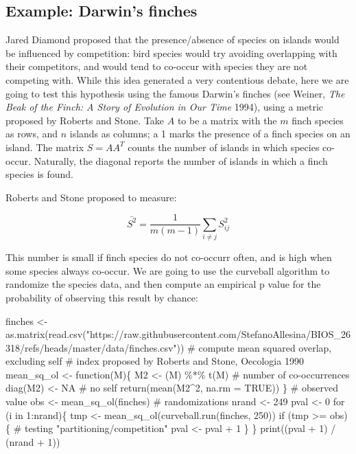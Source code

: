 \documentclass[
  letterpaper,
  DIV=11,
  numbers=noendperiod]{scrreprt}
\newenvironment{Shaded}{\begin{snugshade}}{\end{snugshade}}
\newcommand{\NormalTok}[1]{\textcolor[rgb]{0.00,0.23,0.31}{#1}}
\begin{document}
\subsection{Example: Darwin's finches}\label{example-darwins-finches}

Jared Diamond proposed that the presence/absence of species on islands
would be influenced by competition: bird species would try avoiding
overlapping with their competitors, and would tend to co-occur with
species they are not competing with. While this idea generated a very
contentious debate, here we are going to test this hypothesis using the
famous Darwin's finches (see Weiner, \emph{The Beak of the Finch: A
Story of Evolution in Our Time} 1994), using a metric proposed by
Roberts and Stone. Take \(A\) to be a matrix with the \(m\) finch
species as rows, and \(n\) islands as columns; a 1 marks the presence of
a finch species on an island. The matrix \(S = A A^T\) counts the number
of islands in which species co-occur. Naturally, the diagonal reports
the number of islands in which a finch species is found.

Roberts and Stone proposed to measure:

\[
\bar{S^2} = \frac{1}{m (m-1)} \sum_{i\neq j}S_{ij}^2
\]

This number is small if finch species do not co-occurr often, and is
high when some species always co-occur. We are going to use the
curveball algorithm to randomize the species data, and then compute an
empirical p value for the probability of observing this result by
chance:

\begin{Shaded}
\begin{Highlighting}[]
\NormalTok{finches \textless{}{-} as.matrix(read.csv("https://raw.githubusercontent.com/StefanoAllesina/BIOS\_26318/refs/heads/master/data/finches.csv"))}
\NormalTok{\# compute mean squared overlap, excluding self}
\NormalTok{\# index proposed by Roberts and Stone, Oecologia 1990}
\NormalTok{mean\_sq\_ol \textless{}{-} function(M)\{}
\NormalTok{  M2 \textless{}{-} (M) \%*\% t(M) \# number of co{-}occurrences}
\NormalTok{  diag(M2) \textless{}{-} NA \# no self}
\NormalTok{  return(mean(M2\^{}2, na.rm = TRUE))}
\NormalTok{\}}
\NormalTok{\# observed value}
\NormalTok{obs \textless{}{-} mean\_sq\_ol(finches)}
\NormalTok{\# randomizations}
\NormalTok{nrand \textless{}{-} 249}
\NormalTok{pval \textless{}{-} 0}
\NormalTok{for (i in 1:nrand)\{}
\NormalTok{  tmp \textless{}{-} mean\_sq\_ol(curveball.run(finches, 250))}
\NormalTok{  if (tmp \textgreater{}= obs) \{ \# testing "partitioning/competition" }
\NormalTok{    pval \textless{}{-} pval + 1}
\NormalTok{  \}}
\NormalTok{\}}
\NormalTok{print((pval + 1) / (nrand + 1))}
\end{Highlighting}
\end{Shaded}
\end{document}
